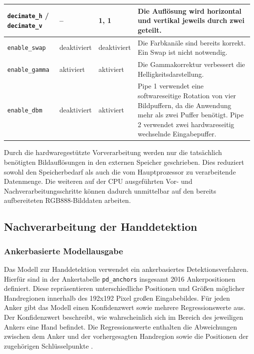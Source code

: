\begin{longtable}{|p{}|p{}|p{}|p{}|}
    \hline
    \texttt{decimate\_h} / \texttt{decimate\_v} & -- & 1, 1 & Die Auflösung wird horizontal und vertikal jeweils durch zwei geteilt. \\
    \hline
    \texttt{enable\_swap} & deaktiviert & deaktiviert & Die Farbkanäle sind bereits korrekt. Ein Swap ist nicht notwendig. \\
    \hline
    \texttt{enable\_gamma} & aktiviert & aktiviert & Die Gammakorrektur verbessert die Helligkeitsdarstellung. \\
    \hline
    \texttt{enable\_dbm} & deaktiviert & aktiviert & Pipe 1 verwendet eine softwareseitige Rotation von vier Bildpuffern, da die Anwendung mehr als zwei Puffer benötigt. Pipe 2 verwendet zwei hardwareseitig wechselnde Eingabepuffer. \\
    \hline
\end{longtable}

Durch die hardwaregestützte Vorverarbeitung werden nur die tatsächlich benötigten Bildauflösungen in den externen Speicher geschrieben. Dies reduziert sowohl den Speicherbedarf als auch die vom Hauptprozessor zu verarbeitende Datenmenge. Die weiteren auf der CPU ausgeführten Vor- und Nachverarbeitungsschritte können dadurch unmittelbar auf den bereits aufbereiteten RGB888-Bilddaten arbeiten.

\subsection{Nachverarbeitung der Handdetektion}\label{sub:nachverarbeitung-palm}
\subsubsection{Ankerbasierte Modellausgabe}\label{ssub:ankerbasierung}

Das Modell zur Handdetektion verwendet ein ankerbasiertes Detektionsverfahren. Hierfür sind in der Ankertabelle \texttt{pd\_anchors} insgesamt 2016 Ankerpositionen definiert. Diese repräsentieren unterschiedliche Positionen und Größen möglicher Handregionen innerhalb des 192x192 Pixel großen Eingabebildes. Für jeden Anker gibt das Modell einen Konfidenzwert sowie mehrere Regressionswerte aus. Der Konfidenzwert beschreibt, wie wahrscheinlich sich im Bereich des jeweiligen Ankers eine Hand befindet. Die Regressionswerte enthalten die Abweichungen zwischen dem Anker und der vorhergesagten Handregion sowie die Positionen der zugehörigen Schlüsselpunkte \cite{zhangMediaPipeHandsOndevice2020}.


